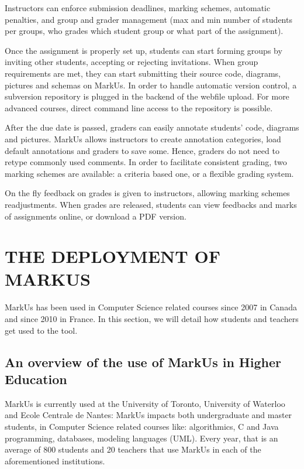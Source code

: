 \documentclass[twocolumn,10pt]{asme2e}
\begin{document}
Instructors can enforce submission deadlines, marking schemes, automatic
penalties, and group and grader management (max and min number of students per
groups, who grades which student group or what part of the assignment).

Once the assignment is properly set up, students can start forming groups by
inviting other students, accepting or rejecting invitations. When group
requirements are met, they can start submitting their source code, diagrams,
pictures and schemas on MarkUs. In order to handle automatic version control,
a subversion repository is plugged in the backend of the webfile upload. For
more advanced courses, direct command line access to the repository is
possible.

After the due date is passed, graders can easily annotate students' code,
diagrams and pictures. MarkUs allows instructors to create annotation
categories, load default annotations and graders to save some. Hence, graders
do not need to retype commonly used comments. In order to facilitate
consistent grading, two marking schemes are available: a criteria based one,
or a flexible grading system.

On the fly feedback on grades is given to instructors, allowing marking
schemes readjustments. When grades are released, students can view feedbacks
and marks of assignments online, or download a PDF version.


\section*{THE DEPLOYMENT OF MARKUS}

MarkUs has been used in Computer Science related courses since 2007 in Canada and since 2010 in France. In this section, we will detail how students and teachers get used to the tool.

\subsection*{An overview of the use of MarkUs in Higher Education}

MarkUs is currently used at the University of Toronto, University of Waterloo and Ecole Centrale de Nantes: 
MarkUs impacts both undergraduate and master students, in Computer Science related courses like: algorithmics, C and Java programming, databases, modeling languages (UML). Every year, that is an average of 800 students and 20 teachers that use MarkUs in each of the aforementioned institutions. %
\end{document}
